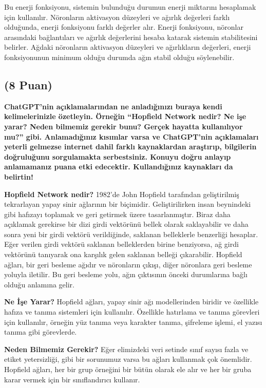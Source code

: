 \documentclass[11pt]{article}
\begin{document}
Bu enerji fonksiyonu, sistemin bulunduğu durumun enerji miktarını hesaplamak için kullanılır. Nöronların aktivasyon düzeyleri ve ağırlık değerleri farklı olduğunda, enerji fonksiyonu farklı değerler alır. Enerji fonksiyonu, nöronlar arasındaki bağlantıları ve ağırlık değerlerini hesaba katarak sistemin stabilitesini belirler. Ağdaki nöronların aktivasyon düzeyleri ve ağırlıkların değerleri, enerji fonksiyonunun minimum olduğu durumda ağın stabil olduğu söylenebilir.

\subsection{(8 Puan)} \textbf{ChatGPT’nin açıklamalarından ne anladığınızı buraya kendi kelimelerinizle özetleyin. Örneğin ``Hopfield Network nedir? Ne işe yarar? Neden bilmemiz gerekir bunu? Gerçek hayatta kullanılıyor mu?'' gibi. Anlamadığınız kısımlar varsa ve ChatGPT’nin açıklamaları yeterli gelmezse internet dahil farklı kaynaklardan araştırıp, bilgilerin doğruluğunu sorgulamakta serbestsiniz. Konuyu doğru anlayıp anlamamanız puana etki edecektir. Kullandığınız kaynakları da belirtin!}

\textbf{Hopfield Network nedir?}
1982'de John Hopfield tarafından geliştirilmiş tekrarlayan yapay sinir ağlarının bir biçimidir. Geliştirilirken insan beynindeki gibi hafızayı toplamak ve geri getirmek üzere tasarlanmıştır. Biraz daha açıklamak gerekirse bir dizi girdi vektörünü bellek olarak saklayabilir ve daha sonra yeni bir girdi vektörü verildiğinde, saklanan belleklerle benzerliği hesaplar. Eğer verilen girdi vektörü saklanan belleklerden birine benziyorsa, ağ girdi vektörünü tanıyarak ona karşılık gelen saklanan belleği çıkarabilir.  Hopfield ağları, bir geri besleme ağıdır ve nöronların çıkışı, diğer nöronlara geri besleme yoluyla iletilir. Bu geri besleme yolu, ağın çıktısının önceki durumlarına bağlı olduğu anlamına gelir.

\textbf{Ne İşe Yarar?}
Hopfield ağları, yapay sinir ağı modellerinden biridir ve özellikle hafıza ve tanıma sistemleri için kullanılır. Özellikle hatırlama ve tanıma görevleri için kullanılır, örneğin yüz tanıma veya karakter tanıma, şifreleme işlemi, el yazısı tanıma gibi görevlerde.

\textbf{Neden Bilmemiz Gerekir?}
Eğer elimizdeki veri setinde sınıf sayısı fazla ve etiket yetersizliği, gibi bir sorunumuz varsa bu ağları kullanmak çok önemlidir. Hopfield ağları, her bir grup örneğini bir bütün olarak ele alır ve her bir gruba karar vermek için bir sınıflandırıcı kullanır.
\end{document}
